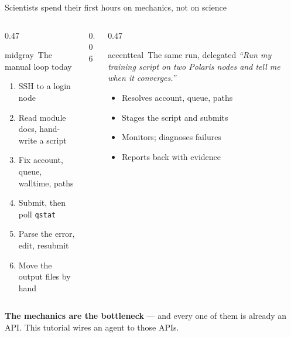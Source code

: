 \documentclass[aspectratio=169,11pt]{beamer}
\newcommand{\takeaway}[3][labnavy]{{\color{#1}\bfseries #2} #3}
\begin{document}
\begin{frame}{Scientists spend their first hours on mechanics, not on science}
  \begin{columns}[T,totalwidth=\textwidth]
    \begin{column}{0.47\textwidth}
      \begin{featbox}{midgray}{\faTerminal\ The manual loop today}
        \scriptsize
        \begin{enumerate}\setlength\itemsep{1pt}
          \item SSH to a login node
          \item Read module docs, hand-write a script
          \item Fix account, queue, walltime, paths
          \item Submit, then poll \texttt{qstat}
          \item Parse the error, edit, resubmit
          \item Move the output files by hand
        \end{enumerate}
      \end{featbox}
    \end{column}
    \begin{column}{0.06\textwidth}\end{column}
    \begin{column}{0.47\textwidth}
      \begin{featbox}{accentteal}{\faRobot\ The same run, delegated}
        \scriptsize
        \textit{``Run my training script on two Polaris nodes and tell me when
        it converges.''}
        \vspace{3pt}
        \begin{itemize}\setlength\itemsep{1pt}
          \item[\faCheckCircle] Resolves account, queue, paths
          \item[\faCheckCircle] Stages the script and submits
          \item[\faCheckCircle] Monitors; diagnoses failures
          \item[\faCheckCircle] Reports back with evidence
        \end{itemize}
      \end{featbox}
    \end{column}
  \end{columns}
  \vspace{6pt}
  \takeaway{The mechanics are the bottleneck}{%
    --- and every one of them is already an API. This tutorial wires an agent
    to those APIs.}
\end{frame}
\end{document}
